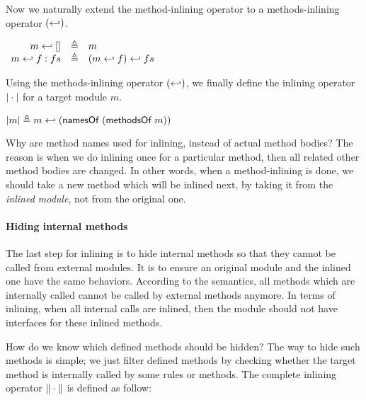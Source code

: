 Now we naturally extend the method-inlining operator to a
methods-inlining operator $(\hookleftarrow)$.
\begin{definition}
  \label{def-inlinedms}
  \mbox{}
  \begin{center}
    \begin{math}
      \begin{array}{rcl}
        m \hookleftarrow{} [] & \triangleq & m \\
        m \hookleftarrow{} f:fs & \triangleq & (m \hookleftarrow{} f) \hookleftarrow{} fs \\
      \end{array}
    \end{math}
  \end{center}
\end{definition}
Using the methods-inlining operator $(\hookleftarrow)$, we finally define the
inlining operator $| \cdot |$ for a target module $m$.
\begin{definition}
  \label{def-inline}
  \mbox{}
  \begin{center}
    \begin{math}
      | m | \triangleq m \hookleftarrow{} (\textsf{namesOf}\ (\textsf{methodsOf}\ m))
    \end{math}
  \end{center}
\end{definition}

Why are method names used for inlining, instead of actual method
bodies? The reason is when we do inlining once for a particular
method, then all related other method bodies are changed. In other
words, when a method-inlining is done, we should take a new method
which will be inlined next, by taking it from the \emph{inlined
  module}, not from the original one.

\paragraph{Hiding internal methods}

The last step for inlining is to hide internal methods so that they
cannot be called from external modules. It is to ensure an original
module and the inlined one have the same behaviors. According to the
semantics, all methods which are internally called cannot be called by
external methods anymore. In terms of inlining, when all internal
calls are inlined, then the module should not have interfaces for
these inlined methods.

How do we know which defined methods should be hidden? The way to hide
such methods is simple; we just filter defined methods by checking
whether the target method is internally called by some rules or
methods. The complete inlining operator $\| \cdot \|$ is defined
as follow:

